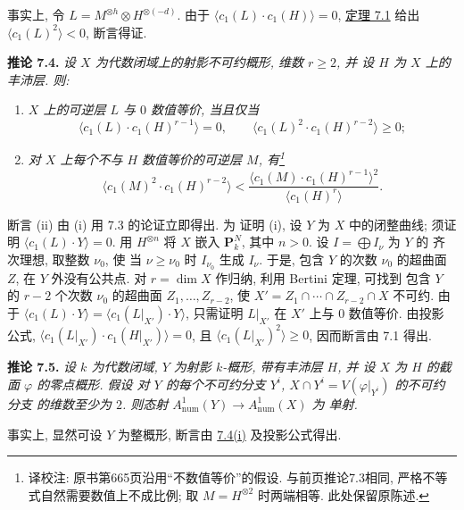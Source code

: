 事实上, 令 $L=M^{\otimes h}\otimes H^{\otimes(-d)}$. 由于
$\langle c_1(L)\cdot c_1(H)\rangle=0$, \hyperlink{sga6.e13.thm.7-1}{定理 7.1} 给出
$\langle c_1(L)^2\rangle<0$, 断言得证.

\textbf{推论 7.4.} \emph{设 $X$ 为代数闭域上的射影不可约概形,
维数 $r\geq2$, 并
设 $H$ 为 $X$ 上的丰沛层. 则:}
\begin{enumerate}[label=(\roman*)]
\item \emph{$X$ 上的可逆层 $L$ 与
$0$ 数值等价, 当且仅当}
\[
  \langle c_1(L)\cdot c_1(H)^{r-1}\rangle=0,
  \qquad
  \langle c_1(L)^2\cdot c_1(H)^{r-2}\rangle\geq0;
\]
\item \emph{对 $X$ 上每个不与 $H$
数值等价的可逆层 $M$, 有\footnote{译校注: 原书第665页沿用“不数值等价”的假设. 与前页推论7.3相同, 严格不等式自然需要数值上不成比例; 取 $M=H^{\otimes2}$ 时两端相等. 此处保留原陈述.}}
\[
  \langle c_1(M)^2\cdot c_1(H)^{r-2}\rangle
  <\frac{\langle c_1(M)\cdot c_1(H)^{r-1}\rangle^2}
  {\langle c_1(H)^r\rangle}.
\]
\end{enumerate}

断言 (ii) 由 (i) 用 7.3 的论证立即得出. 为
证明 (i), 设 $Y$ 为 $X$ 中的闭整曲线; 须证明
$\langle c_1(L)\cdot Y\rangle=0$. 用 $H^{\otimes n}$ 将 $X$ 嵌入 $\mathbf P^N_k$,
其中 $n>0$. 设 $I=\bigoplus I_\nu$ 为 $Y$ 的
齐次理想, 取整数 $\nu_0$, 使
当 $\nu\geq\nu_0$ 时 $I_{\nu_0}$ 生成 $I_\nu$. 于是,
包含 $Y$ 的次数 $\nu_0$ 的超曲面 $Z$,
在 $Y$ 外没有公共点. 对 $r=\dim X$ 作归纳, 利用 Bertini 定理, 可找到
包含 $Y$ 的 $r-2$ 个次数 $\nu_0$ 的超曲面 $Z_1,\ldots,Z_{r-2}$,
使 $X'=Z_1\cap\cdots\cap Z_{r-2}\cap X$ 不可约.
由于 $\langle c_1(L)\cdot Y\rangle
=\langle c_1(L|_{X'})\cdot Y\rangle$, 只需证明
$L|_{X'}$ 在 $X'$ 上与 $0$ 数值等价. 由投影
公式, $\langle c_1(L|_{X'})\cdot c_1(H|_{X'})\rangle=0$, 且
$\langle c_1(L|_{X'})^2\rangle\geq0$, 因而断言由 7.1 得出.

\textbf{推论 7.5.} \emph{设 $k$ 为代数闭域,
$Y$ 为射影 $k$-概形, 带有丰沛层 $H$, 并
设 $X$ 为 $H$ 的截面 $\varphi$ 的零点概形. 假设
对 $Y$ 的每个不可约分支 $Y^i$,
$X\cap Y^i=V(\varphi|_{Y^i})$ 的不可约分支
的维数至少为 $2$. 则态射
$A^1_{\mathrm{num}}(Y)\longrightarrow A^1_{\mathrm{num}}(X)$ 为
单射.}

事实上, 显然可设 $Y$ 为整概形, 断言由 \hyperlink{sga6.e13.cor.7-4}{7.4(i)} 及投影公式得出.


